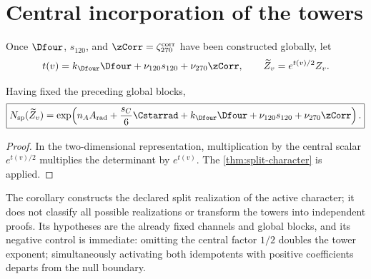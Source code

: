 \section{Central incorporation of the towers}
\label{sec:factorizacion-split-torres}

Once \(\Dfour\), \(s_{120}\), and
\(\zCorr=\zeta_{270}^{\rm corr}\) have been constructed globally, let
\[
 t(v)=
 k_{\Dfour}\Dfour
 +\nu_{120}s_{120}
 +\nu_{270}\zCorr,
 \qquad
 \widetilde Z_v=e^{t(v)/2}Z_v.
\]

\begin{corollary}
\label{cor:split-character-torres}
Having fixed the preceding global blocks,
\[
 \boxed{
 N_{\rm sp}(\widetilde Z_v)
 =\exp\!\left(
 n_AA_{\rm rad}+\frac{s_C}{6}\Cstarrad
 +k_{\Dfour}\Dfour+\nu_{120}s_{120}
 +\nu_{270}\zCorr
 \right).}
\]
\end{corollary}

\begin{proof}
In the two-dimensional representation, multiplication by the central scalar
\(e^{t(v)/2}\) multiplies the determinant by \(e^{t(v)}\). The
\cref{thm:split-character} is applied.
\end{proof}

The corollary constructs the declared split realization of the active character;
it does not classify all possible realizations or transform the towers into
independent proofs. Its hypotheses are the already fixed channels and global
blocks, and its negative control is immediate: omitting the central factor
\(1/2\) doubles the tower exponent; simultaneously activating both
idempotents with positive coefficients departs from the null boundary.
